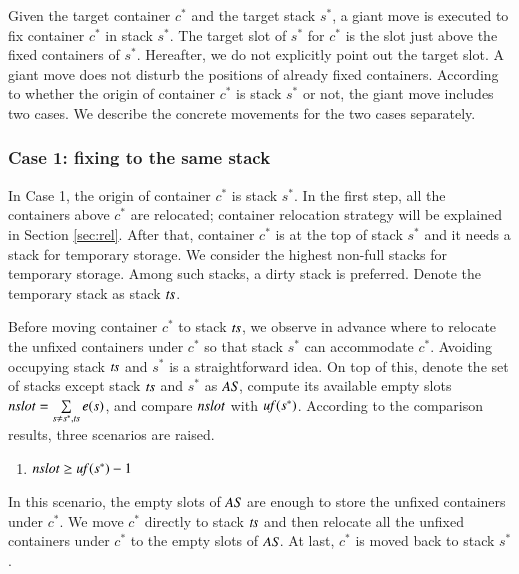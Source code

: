 \documentclass[review,3p,times,authoryear,12pt]{elsarticle}
\begin{document}
Given the target container $c^*$ and the target stack $s^*$, a giant move is executed to fix container $c^*$ in stack $s^*$. The target slot of $s^*$ for $c^*$ is the slot just above the fixed containers of $s^*$. Hereafter, we do not explicitly point out the target slot.
A giant move does not disturb the positions of already fixed containers. According to whether the origin of container $c^*$ is stack $s^*$ or not, the giant move includes two cases. We describe the concrete movements for the two cases separately.

\subsubsection{Case 1: fixing to the same stack}

In Case 1, the origin of container $c^*$ is stack $s^*$. In the first step, all the containers above $c^*$ are relocated; container relocation strategy will be explained in Section \ref{sec:rel}. After that, container $c^*$ is at the top of stack $s^*$ and it needs a stack for temporary storage. We consider the highest non-full stacks for temporary storage. Among such stacks, a dirty stack is preferred. Denote the temporary stack as stack $\id{ts}$.

Before moving container $c^*$ to stack $\id{ts}$, we observe in advance where to relocate the unfixed containers under $c^*$ so that stack $s^*$ can accommodate $c^*$. Avoiding occupying stack $\id{ts}$ and $s^*$ is a straightforward idea. On top of this, denote the set of stacks except stack $\id{ts}$ and $s^*$ as $\id{AS}$, compute its available empty slots $\id{nslot} = \sum\limits_{s\neq s^*, \id{ts}}e(s)$, and compare $\id{nslot}$ with $\id{uf}(s^*)$. According to the comparison results, three scenarios are raised.

\begin{enumerate}
\setcounter{enumi}{0}
\item $\id{nslot}\ge \id{uf}(s^*)-1$
\end{enumerate}
In this scenario, the empty slots of $\id{AS}$ are enough to store the unfixed containers under $c^*$. We move $c^*$ directly to stack $\id{ts}$ and then relocate all the unfixed containers under $c^*$ to the empty slots of $\id{AS}$. At last, $c^*$ is moved back to stack $s^*$.
\end{document}
